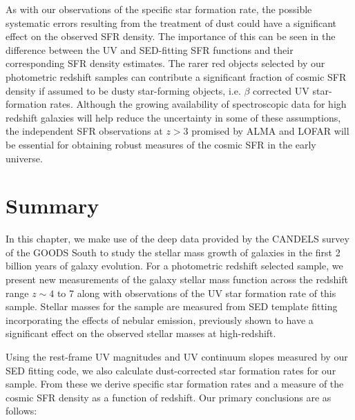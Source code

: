 As with our observations of the specific star formation rate, the possible systematic errors resulting from the treatment of dust could have a significant effect on the observed SFR density. The importance of this can be seen in the difference between the UV and SED-fitting SFR functions and their corresponding SFR density estimates. The rarer red objects selected by our photometric redshift samples can contribute a significant fraction of cosmic SFR density if assumed to be dusty star-forming objects, i.e. $\beta$ corrected UV star-formation rates. Although the growing availability of spectroscopic data for high redshift galaxies will help reduce the uncertainty in some of these assumptions, the independent SFR observations at $z > 3$ promised by ALMA and LOFAR will be essential for obtaining robust measures of the cosmic SFR in the early universe.

\section{Summary}\label{smf-sec:summary}
In this chapter, we make use of the deep data provided by the CANDELS survey of the GOODS South to study the stellar mass growth of galaxies in the first 2 billion years of galaxy evolution. For a photometric redshift selected sample, we present new measurements of the galaxy stellar mass function across the redshift range $z \sim 4$ to 7 along with observations of the UV star formation rate of this sample. Stellar masses for the sample are measured from SED template fitting incorporating the effects of nebular emission, previously shown to have a significant effect on the observed stellar masses at high-redshift. 

Using the rest-frame UV magnitudes and UV continuum slopes measured by our SED fitting code, we also calculate dust-corrected star formation rates for our sample. From these we derive specific star formation rates and a measure of the cosmic SFR density as a function of redshift. Our primary conclusions are as follows:

